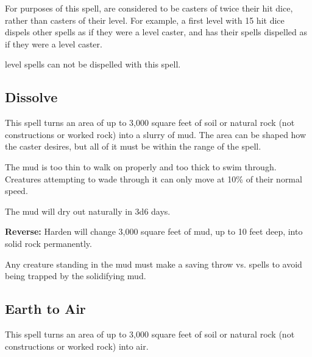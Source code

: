 \begin{multicols*}{2}
For purposes of this spell,  are considered to be casters of twice their hit dice, rather than casters of their level. For example, a first level  with 15 hit dice dispels other spells as if they were a  level caster, and has their spells dispelled as if they were a  level caster.

 level spells can not be dispelled with this spell.

\subsection{Dissolve}\label{spell:Dissolve}

This spell turns an area of up to 3,000 square feet of soil or natural rock (not constructions or worked rock) into a slurry of mud. The area can be shaped how the caster desires, but all of it must be within the range of the spell.

The mud is too thin to walk on properly and too thick to swim through. Creatures attempting to wade through it can only move at 10\% of their normal speed.

The mud will dry out naturally in 3d6 days.

\textbf{Reverse:} \hypertarget{spell:Harden}{Harden} will change 3,000 square feet of mud, up to 10 feet deep, into solid rock permanently.

Any creature standing in the mud must make a saving throw vs. spells to avoid being trapped by the solidifying mud.

\subsection{Earth to Air}\label{spell:Earth to Air}

This spell turns an area of up to 3,000 square feet of soil or natural rock (not constructions or worked rock) into air.


\end{multicols*}
